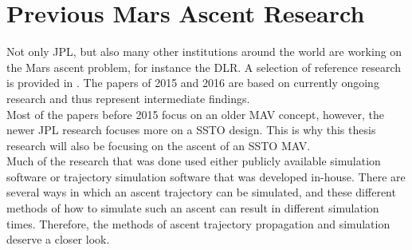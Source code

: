 
\section{Previous Mars Ascent Research}
\label{sec:previousMarsAscentResearch}
Not only \ac{JPL}, but also many other institutions around the world are working on the Mars ascent problem, for instance the \ac{DLR}. A selection of reference research is provided in . The papers of 2015 and 2016 are based on currently ongoing research and thus represent intermediate findings.\\

\noindent
Most of the papers before 2015 focus on an older \ac{MAV} concept, however, the newer \ac{JPL} research focuses more on a \ac{SSTO} design. This is why this thesis research will also be focusing on the ascent of an \ac{SSTO} \ac{MAV}. \\
Much of the research that was done used either publicly available simulation software or trajectory simulation software that was developed in-house. There are several ways in which an ascent trajectory can be simulated, and these different methods of how to simulate such an ascent can result in different simulation times. Therefore, the methods of ascent trajectory propagation and simulation deserve a closer look.

